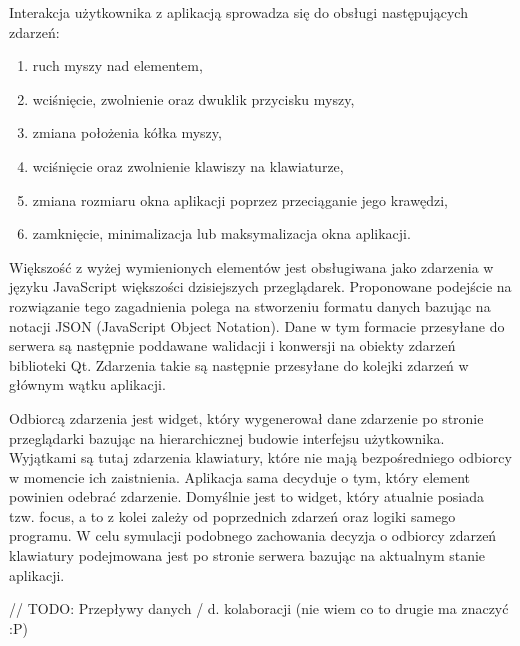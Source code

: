Interakcja użytkownika z aplikacją sprowadza się do obsługi następujących zdarzeń:
\begin{enumerate}
  \item ruch myszy nad elementem,
  \item wciśnięcie, zwolnienie oraz dwuklik przycisku myszy,
  \item zmiana położenia kółka myszy,
  \item wciśnięcie oraz zwolnienie klawiszy na klawiaturze,
  \item zmiana rozmiaru okna aplikacji poprzez przeciąganie jego krawędzi,
  \item zamknięcie, minimalizacja lub maksymalizacja okna aplikacji.
\end{enumerate}
Większość z wyżej wymienionych elementów jest obsługiwana jako zdarzenia w języku JavaScript większości dzisiejszych przeglądarek. Proponowane podejście na rozwiązanie tego zagadnienia polega na stworzeniu formatu danych bazując na notacji JSON (JavaScript Object Notation). Dane w tym formacie przesyłane do serwera są następnie poddawane walidacji i konwersji na obiekty zdarzeń biblioteki Qt. Zdarzenia takie są następnie przesyłane do kolejki zdarzeń w głównym wątku aplikacji.

Odbiorcą zdarzenia jest widget, który wygenerował dane zdarzenie po stronie przeglądarki bazując na hierarchicznej budowie interfejsu użytkownika. Wyjątkami są tutaj zdarzenia klawiatury, które nie mają bezpośredniego odbiorcy w momencie ich zaistnienia. Aplikacja sama decyduje o tym, który element powinien odebrać zdarzenie. Domyślnie jest to widget, który atualnie posiada tzw. focus, a to z kolei zależy od poprzednich zdarzeń oraz logiki samego programu. W celu symulacji podobnego zachowania decyzja o odbiorcy zdarzeń klawiatury podejmowana jest po stronie serwera bazując na aktualnym stanie aplikacji.

// TODO: Przepływy danych / d. kolaboracji (nie wiem co to drugie ma znaczyć :P)